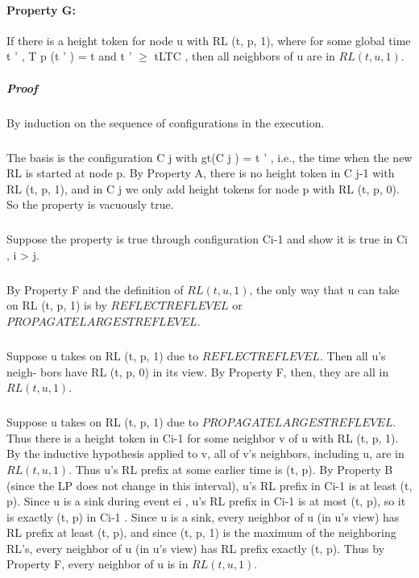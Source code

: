 \paragraph{Property G:} If there is a height token for node u with RL (t, p, 1), where for some global time t ' , T p (t ' ) = t and t ' $\geq$ tLTC , then all neighbors of u are in $RL (t, u, 1)$.
\subparagraph{Proof} By induction on the sequence of configurations in the execution.
\subparagraph{}The basis is the configuration C j with gt(C j ) = t ' , i.e., the time when the new RL is started at node p. By Property A, there is no height token in C j-1 with RL (t, p, 1), and in C j we only add height tokens for node p with RL (t, p, 0). So the property is vacuously true.
\subparagraph{}Suppose the property is true through configuration Ci-1 and show it is true in Ci , i > j.
\subparagraph{}By Property F and the definition of $RL (t, u, 1)$, the only way that u can take on RL (t, p, 1) is by $REFLECTREFLEVEL$ or $PROPAGATELARGESTREFLEVEL$.
\subparagraph{}Suppose u takes on RL (t, p, 1) due to $REFLECTREFLEVEL$. Then all u's neigh- bors have RL (t, p, 0) in its view. By Property F, then, they are all in $RL (t, u, 1)$.
\subparagraph{}Suppose u takes on RL (t, p, 1) due to $PROPAGATELARGESTREFLEVEL$. Thus there is a height token in Ci-1 for some neighbor v of u with RL (t, p, 1). By the inductive hypothesis applied to v, all of v's neighbors, including u, are in $RL (t, u, 1)$. Thus u's RL prefix at some earlier time is (t, p). By Property B (since the LP does not change in this interval), u's RL prefix in Ci-1 is at least (t, p). Since u is a sink during event ei , u's RL prefix in Ci-1 is at most (t, p), so it is exactly (t, p) in Ci-1 . Since u is a sink, every neighbor of u (in u's view) has RL prefix at least (t, p), and since (t, p, 1) is the maximum of the neighboring RL's, every neighbor of u (in u's view) has RL prefix exactly (t, p). Thus by Property F, every neighbor of u is in $RL (t, u, 1)$.
